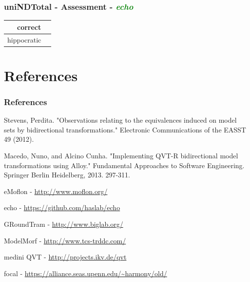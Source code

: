 \documentclass{beamer}
\newcommand{\cmark}{\ding{51}}%
\begin{document}
\begin{frame}
\frametitle{uniNDTotal - \textbf{Assessment} - \textbf{\textit{\textcolor{green}{echo}}}}

\begin{center}
\begin{tabular}{| r | c |}
  \hline                        
  correct & \cmark\\
  \hline
  hippocratic & \cmark\\
  \hline 
\end{tabular}
\end{center}

\end{frame}







\section{References}
\begin{frame}

\frametitle{References}


\begin{scriptsize}

\begin{thebibliography}{99} %

Stevens, Perdita. "Observations relating to the equivalences induced on model sets by bidirectional transformations." Electronic Communications of the EASST 49 (2012).

 Macedo, Nuno, and Alcino Cunha. "Implementing QVT-R bidirectional model transformations using Alloy." Fundamental Approaches to Software Engineering. Springer Berlin Heidelberg, 2013. 297-311.


 eMoflon - \url{http://www.moflon.org/}

 echo - \url{https://github.com/haslab/echo}

 GRoundTram - \url{http://www.biglab.org/}

 ModelMorf - \url{http://www.tcs-trddc.com/}

 medini QVT - \url{http://projects.ikv.de/qvt}

 focal - \url{https://alliance.seas.upenn.edu/~harmony/old/}

\end{thebibliography}
\end{scriptsize}


\end{frame}
\end{document}
